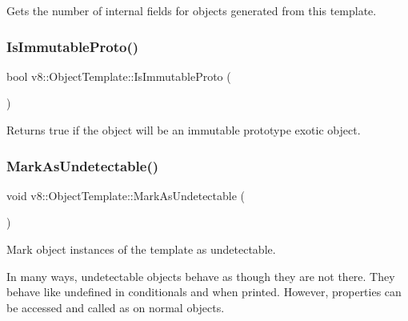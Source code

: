 Gets the number of internal fields for objects generated from this template. \mbox{\label{classv8_1_1ObjectTemplate_a76c12ee7be283bd3b007d062686dc0ed}} 
\subsubsection{\texorpdfstring{Is\+Immutable\+Proto()}{IsImmutableProto()}}
{\footnotesize\ttfamily bool v8\+::\+Object\+Template\+::\+Is\+Immutable\+Proto (\begin{DoxyParamCaption}{ }\end{DoxyParamCaption})}

Returns true if the object will be an immutable prototype exotic object. \mbox{\label{classv8_1_1ObjectTemplate_a7e40ef313b44c2ad336c73051523b4f8}} 
\subsubsection{\texorpdfstring{Mark\+As\+Undetectable()}{MarkAsUndetectable()}}
{\footnotesize\ttfamily void v8\+::\+Object\+Template\+::\+Mark\+As\+Undetectable (\begin{DoxyParamCaption}{ }\end{DoxyParamCaption})}

Mark object instances of the template as undetectable.

In many ways, undetectable objects behave as though they are not there. They behave like \textquotesingle{}undefined\textquotesingle{} in conditionals and when printed. However, properties can be accessed and called as on normal objects. \mbox{\label{classv8_1_1ObjectTemplate_ae0bcd58e9e069c50148c377d774de7a1}} 
